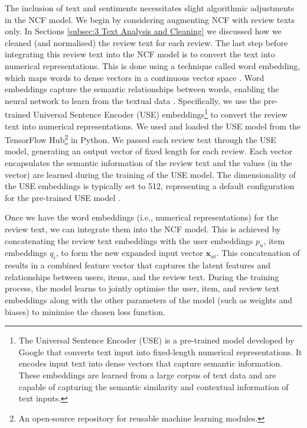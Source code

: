 The inclusion of text and sentiments necessitates slight algorithmic adjustments in the NCF model. We begin by considering augmenting NCF with review texts only. In Sections \ref{subsec:3 Text Analysis and Cleaning} we discussed how we cleaned (and normalised) the review text for each review. The last step before integrating this review text into the NCF model is to convert the text into numerical representations. This is done using a technique called word embedding, which maps words to dense vectors in a continuous vector space \cite{asudani2023impact}. Word embeddings capture the semantic relationships between words, enabling the neural network to learn from the textual data \cite{mikolov2013distributed}. Specifically, we use the pre-trained Universal Sentence Encoder (USE)\cite{cer2018universal} embeddings\footnote{The Universal Sentence Encoder (USE) is a pre-trained model developed by Google that converts text input into fixed-length numerical representations. It encodes input text into dense vectors that capture semantic information. These embeddings are learned from a large corpus of text data and are capable of capturing the semantic similarity and contextual information of text inputs.} to convert the review text into numerical representations. We used and loaded the USE model from the TensorFlow Hub\footnote{An open-source repository for reusable machine learning modules.} in Python. We passed each review text through the USE model, generating an output vector of fixed length for each review. Each vector encapsulates the semantic information of the review text and the values (in the vector) are learned during the training of the USE model. The dimensionality of the USE embeddings is typically set to 512, representing a default configuration for the pre-trained USE model \cite{cer2018universal}.

Once we have the word embeddings (i.e., numerical representations) for the review text, we can integrate them into the NCF model. This is achieved by concatenating the review text embeddings with the user embeddings $p_u$, item embeddings $q_i$, to form the new expanded input vector $\mathbf{x}_{ui}$. This concatenation of results in a combined feature vector that captures the latent features and relationships between users, items, and the review text. During the training process, the model learns to jointly optimise the user, item, and review text embeddings along with the other parameters of the model (such as weights and biases) to minimise the chosen loss function.


